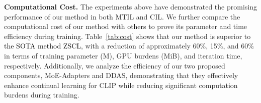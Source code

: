 \begin{table}[t]
	\centering
	\caption{\textcolor{Black}{Comparison of computational cost during training between our method and others in terms of training parameters, GPU burdens and training times of each iteration. And the \textbf{$\Delta$} is the improvement relative to the SOTA ZSCL~\cite{zheng2023preventing}.}}
	\label{tab:cost}
 \vspace{-10pt}
\end{table}

\noindent\textbf{Computational Cost.}
The experiments above have demonstrated the promising performance of our method in both MTIL and CIL. We further compare the computational cost of our method with \textcolor{Black}{others} to prove its parameter and time efficiency during training. Table~\ref{tab:cost} shows that our method is superior to \textcolor{Black}{the SOTA method ZSCL}, with a reduction of approximately 60\%, 15\%, and 60\% in terms of training parameter (M), GPU burdens (MiB), and iteration time, respectively. Additionally, we analyze the efficiency of our two proposed components, MoE-Adapters and DDAS, demonstrating that they effectively enhance continual learning for CLIP while reducing significant computation burdens during training.  





